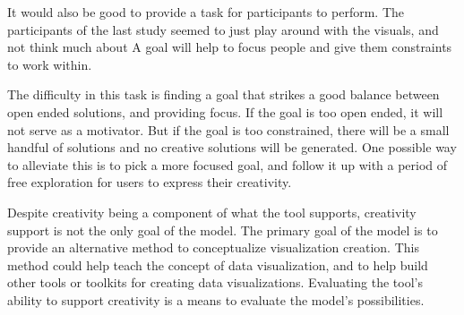 It would also be good to provide a task for participants to perform.
The participants of the last study seemed to just play around with the visuals, and not think much about 
A goal will help to focus people and give them constraints to work within.

The difficulty in this task is finding a goal that strikes a good balance between open ended solutions, and providing focus.
If the goal is too open ended, it will not serve as a motivator.
But if the goal is too constrained, there will be a small handful of solutions and no creative solutions will be generated.
One possible way to alleviate this is to pick a more focused goal, and follow it up with a period of free exploration for users to express their creativity.

Despite creativity being a component of what the tool supports, creativity support is not the only goal of the model.
The primary goal of the model is to provide an alternative method to conceptualize visualization creation.
This method could help teach the concept of data visualization, and to help build other tools or toolkits for creating data visualizations.
Evaluating the tool's ability to support creativity is a means to evaluate the model's possibilities.